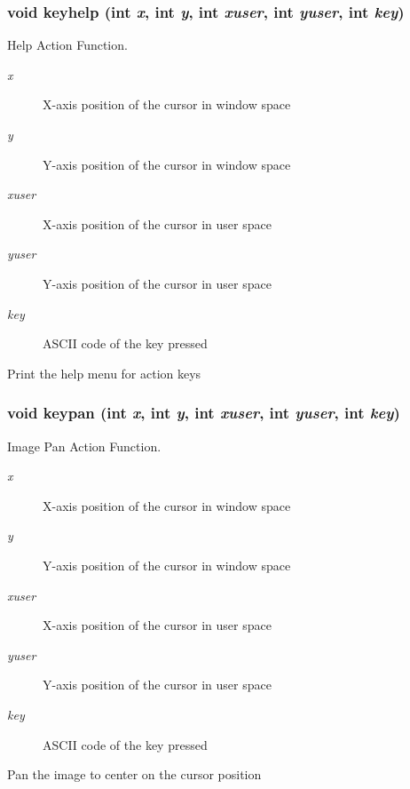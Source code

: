 \subsubsection{\setlength{\rightskip}{0pt plus 5cm}void keyhelp (int {\em x}, int {\em y}, int {\em xuser}, int {\em yuser}, int {\em key})}\label{xtv_8h_a108}


Help Action Function. 

\begin{Desc}
\item[Parameters:]
\begin{description}
\item[{\em x}]X-axis position of the cursor in window space \item[{\em y}]Y-axis position of the cursor in window space \item[{\em xuser}]X-axis position of the cursor in user space \item[{\em yuser}]Y-axis position of the cursor in user space \item[{\em key}]ASCII code of the key pressed\end{description}
\end{Desc}
Print the help menu for action keys 
\subsubsection{\setlength{\rightskip}{0pt plus 5cm}void keypan (int {\em x}, int {\em y}, int {\em xuser}, int {\em yuser}, int {\em key})}\label{xtv_8h_a105}


Image Pan Action Function. 

\begin{Desc}
\item[Parameters:]
\begin{description}
\item[{\em x}]X-axis position of the cursor in window space \item[{\em y}]Y-axis position of the cursor in window space \item[{\em xuser}]X-axis position of the cursor in user space \item[{\em yuser}]Y-axis position of the cursor in user space \item[{\em key}]ASCII code of the key pressed\end{description}
\end{Desc}
Pan the image to center on the cursor position 
